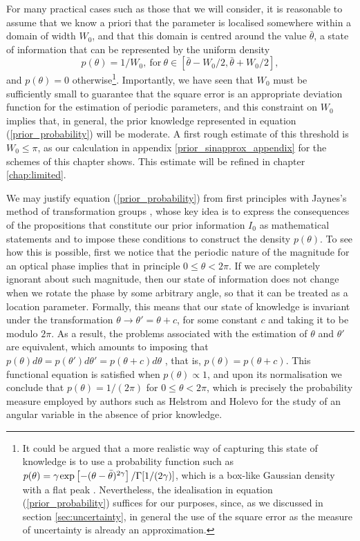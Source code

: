 For many practical cases such as those that we will consider, it is reasonable to assume that we know a priori that the parameter is localised somewhere within a domain of width $W_0$, and that this domain is centred around the value $\bar{\theta}$, a state of information that can be represented by the uniform density
\begin{equation}
p(\theta) = 1/W_0,~\mathrm{for}~\theta \in [\bar{\theta}-W_0/2, \bar{\theta}+W_0/2],
\label{prior_probability}
\end{equation}
and $p(\theta)=0$ otherwise\footnote{It could be argued that a more realistic way of capturing this state of knowledge is to use a probability function such as $p(\theta)=\gamma \hspace{0.1em} \mathrm{exp}\left[-(\theta-\bar{\theta})^{2\gamma}\right]/\Gamma[1/(2\gamma)]$, which is a box-like Gaussian density with a flat peak \cite{braunstein_gaussian1992}. Nevertheless, the idealisation in equation (\ref{prior_probability}) suffices for our purposes, since, as we discussed in section \ref{sec:uncertainty}, in general the use of the square error as the measure of uncertainty is already an approximation.}. Importantly, we have seen that $W_0$ must be sufficiently small to guarantee that the square error is an appropriate deviation function for the estimation of periodic parameters, and this constraint on $W_0$ implies that, in general, the prior knowledge represented in equation (\ref{prior_probability}) will be moderate. A first rough estimate of this threshold is $W_0 \leqslant \pi$, as our calculation in appendix \ref{prior_sinapprox_appendix} for the schemes of this chapter shows. This estimate will be refined in chapter \ref{chap:limited}. 

We may justify equation (\ref{prior_probability}) from first principles with Jaynes's method of transformation groups \cite{jaynes1968, jaynes2003, toussaint2011}, whose key idea is to express the consequences of the propositions that constitute our prior information $I_0$ as mathematical statements and to impose these conditions to construct the density $p(\theta)$. To see how this is possible, first we notice that the periodic nature of the magnitude for an optical phase implies that in principle $0 \leqslant \theta < 2\pi$. If we are completely ignorant about such magnitude, then our state of information does not change when we rotate the phase by some arbitrary angle, so that it can be treated as a location parameter. Formally, this means that our state of knowledge is invariant under the transformation $\theta \rightarrow \theta' = \theta + c$, for some constant $c$ and taking it to be modulo $2\pi$. As a result, the problems associated with the estimation of $\theta$ and $\theta'$ are equivalent, which amounts to imposing that $p(\theta) d\theta = p(\theta') d\theta'=p(\theta + c) d\theta$ \cite{jaynes2003}, that is, $p(\theta) = p(\theta + c)$. This functional equation is satisfied when $p(\theta) \propto 1$, and upon its normalisation we conclude that $p(\theta) = 1/(2\pi)$ for $0 \leqslant \theta < 2\pi$, which is precisely the probability measure employed by authors such as Helstrom \cite{helstrom1976} and Holevo \cite{holevo2011} for the study of an angular variable in the absence of prior knowledge.

